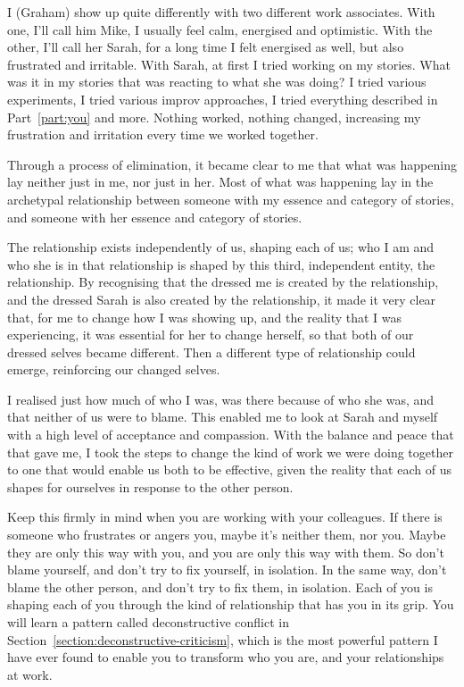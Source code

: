 \begin{longstoryblock}
I (Graham) show up quite differently with two different work associates. With one, I'll call him Mike, I usually feel calm, energised and optimistic. With the other, I'll call her Sarah, for a long time I felt energised as well, but also frustrated and irritable. With Sarah, at first I tried working on my stories. What was it in my stories that was reacting to what she was doing? I tried various experiments, I tried various improv approaches, I tried everything described in Part~\ref{part:you} and more. Nothing worked, nothing changed, increasing my frustration and irritation every time we worked together.


Through a process of elimination, it became clear to me that what was happening lay neither just in me, nor just in her. Most of what was happening lay in the archetypal relationship between someone with my essence and category of stories, and someone with her essence and category of stories. 


The relationship exists independently of us, shaping each of us; who I am and who she is in that relationship is shaped by this third, independent entity, the relationship. By recognising that the dressed me is created by the relationship, and the dressed Sarah is also created by the relationship, it made it very clear that, for me to change how I was showing up, and the reality that I was experiencing, it was essential for her to change herself, so that both of our dressed selves became different. Then a different type of relationship could emerge, reinforcing our changed selves.


I realised just how much of who I was, was there because of who she was, and that neither of us were to blame. This enabled me to look at Sarah and myself with a high level of acceptance and compassion. With the balance and peace that that gave me, I took the steps to change the kind of work we were doing together to one that would enable us both to be effective, given the reality that each of us shapes for ourselves in response to the other person.
\end{longstoryblock}


Keep this firmly in mind when you are working with your colleagues. If there is someone who frustrates or angers you, maybe it's neither them, nor you. Maybe they are only this way with you, and you are only this way with them. So don't blame yourself, and don't try to fix yourself, in isolation. In the same way, don’t blame the other person, and don’t try to fix them, in isolation. Each of you is shaping each of you through the kind of relationship that has you in its grip. You will learn a pattern called deconstructive conflict in Section~\ref{section:deconstructive-criticism},  which is the most powerful pattern I have ever found to enable you to transform who you are, and your relationships at work.


